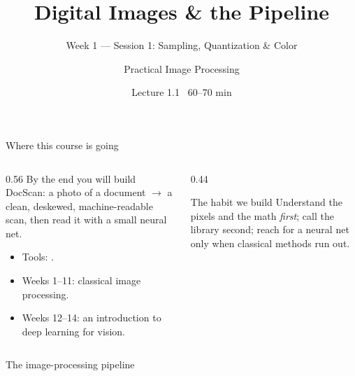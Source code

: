 \documentclass[10pt,aspectratio=169]{beamer}
\title{Digital Images \& the Pipeline}
\subtitle{Week 1 — Session 1: Sampling, Quantization \& Color}
\author{Practical Image Processing}
\date{Lecture 1.1 \textbullet\ 60--70 min}
\begin{document}
\maketitle

\begin{frame}{Where this course is going}
  \begin{columns}[T]
    \begin{column}{0.56\textwidth}
      By the end you will build \alert{DocScan}: a photo of a document $\rightarrow$ a clean,
      deskewed, machine-readable scan, then read it with a small neural net.
      \begin{itemize}
        \item Tools: .
        \item Weeks 1--11: classical image processing.
        \item Weeks 12--14: an introduction to deep learning for vision.
      \end{itemize}
    \end{column}
    \begin{column}{0.44\textwidth}
      \begin{alertblock}{The habit we build}
        Understand the pixels and the math \emph{first}; call the library second; reach for a
        neural net only when classical methods run out.
      \end{alertblock}
    \end{column}
  \end{columns}
\end{frame}

\begin{frame}{The image-processing pipeline}
  \begin{center}
  \end{center}
\end{frame}
\end{document}
